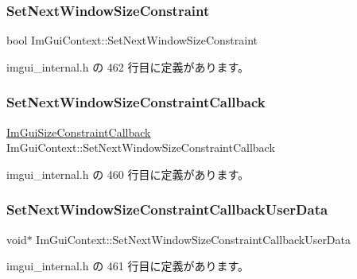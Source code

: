 \subsubsection{\texorpdfstring{Set\+Next\+Window\+Size\+Constraint}{SetNextWindowSizeConstraint}}
{\footnotesize\ttfamily bool Im\+Gui\+Context\+::\+Set\+Next\+Window\+Size\+Constraint}



 imgui\+\_\+internal.\+h の 462 行目に定義があります。

\mbox{\label{struct_im_gui_context_a304a1bfd5dbcebee45ba8cdfa5d231cb}} 
\subsubsection{\texorpdfstring{Set\+Next\+Window\+Size\+Constraint\+Callback}{SetNextWindowSizeConstraintCallback}}
{\footnotesize\ttfamily \mbox{\hyperlink{imgui_8h_abc6351d68ee31882cbb95d2b3d835cae}{Im\+Gui\+Size\+Constraint\+Callback}} Im\+Gui\+Context\+::\+Set\+Next\+Window\+Size\+Constraint\+Callback}



 imgui\+\_\+internal.\+h の 460 行目に定義があります。

\mbox{\label{struct_im_gui_context_a5da8374c369cff287b16ac7d8e3a7901}} 
\subsubsection{\texorpdfstring{Set\+Next\+Window\+Size\+Constraint\+Callback\+User\+Data}{SetNextWindowSizeConstraintCallbackUserData}}
{\footnotesize\ttfamily void$\ast$ Im\+Gui\+Context\+::\+Set\+Next\+Window\+Size\+Constraint\+Callback\+User\+Data}



 imgui\+\_\+internal.\+h の 461 行目に定義があります。

